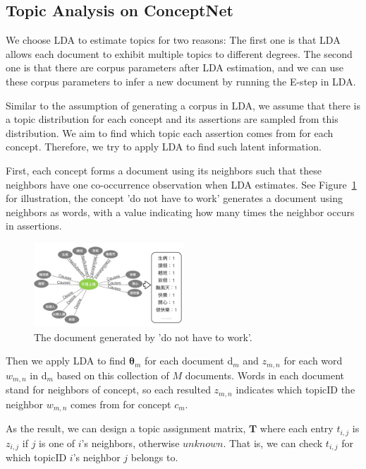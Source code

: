 \subsection{Topic Analysis on ConceptNet}
We choose LDA to estimate topics for two reasons: The first one is that LDA allows each document to exhibit multiple topics to different degrees. The second one is that there are corpus parameters after LDA estimation, and we can use these corpus parameters to infer a new document by running the E-step in LDA. 

Similar to the assumption of generating a corpus in LDA, we assume that there is a topic distribution for each concept and its assertions are sampled from this distribution. We aim to find which topic each assertion comes from for each concept. Therefore, we try to apply LDA to find such latent information. 

First, each concept forms a document using its neighbors such that these neighbors have one co-occurrence observation when LDA estimates. See Figure~\ref{fig:noWorkDoc} for illustration, the concept 'do not have to work' generates a document using neighbors as words, with a value indicating how many times the neighbor occurs in assertions.

\begin{figure}[!t]
\centering
\includegraphics[width=0.5\textwidth]{fig/noWorkDoc.png}
\caption{The document generated by 'do not have to work'.}
\label{fig:noWorkDoc}
\end{figure}

Then we apply LDA to find $\boldsymbol{\theta}_m$ for each document d$_m$ and $z_{m,n}$ for each word $w_{m,n}$ in d$_m$ based on this collection of $M$ documents. Words in each document stand for neighbors of concept, so each resulted $z_{m,n}$ indicates which topicID the neighbor $w_{m,n}$ comes from for concept $c_m$.

As the result, we can design a topic assignment matrix, $\boldsymbol{T}$ where each entry $t_{i,j}$ is $z_{i,j}$ if $j$ is one of $i$'s neighbors, otherwise $unknown$. That is, we can check $t_{i,j}$ for which topicID $i$'s neighbor $j$ belongs to. 

